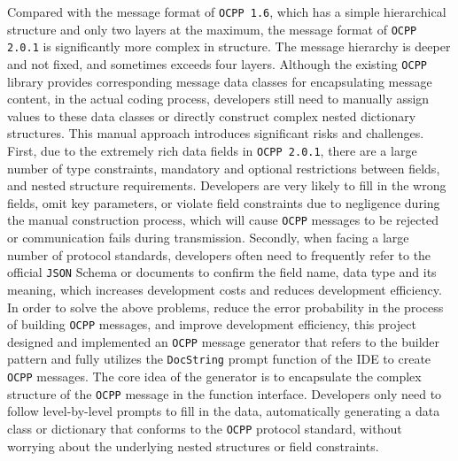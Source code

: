 \documentclass[
english,
ruledheaders=section,%
class=report,%
thesis={type=Report},%
accentcolor=9c,%
custommargins=true,%
marginpar=false,%
parskip=half-,%
fontsize=11pt,%
logofile={img/tuda_logo.pdf}, %
]{tudapub}
\begin{document}
    Compared with the message format of \texttt{OCPP 1.6}, which has a simple hierarchical structure and only two layers at the maximum, the message format of \texttt{OCPP 2.0.1} is significantly more complex in structure. The message hierarchy is deeper and not fixed, and sometimes exceeds four layers. Although the existing \texttt{OCPP} library provides corresponding message data classes for encapsulating message content, in the actual coding process, developers still need to manually assign values to these data classes or directly construct complex nested dictionary structures. This manual approach introduces significant risks and challenges. First, due to the extremely rich data fields in \texttt{OCPP 2.0.1}, there are a large number of type constraints, mandatory and optional restrictions between fields, and nested structure requirements. Developers are very likely to fill in the wrong fields, omit key parameters, or violate field constraints due to negligence during the manual construction process, which will cause \texttt{OCPP} messages to be rejected or communication fails during transmission. Secondly, when facing a large number of protocol standards, developers often need to frequently refer to the official \texttt{JSON} Schema or documents to confirm the field name, data type and its meaning, which increases development costs and reduces development efficiency. In order to solve the above problems, reduce the error probability in the process of building \texttt{OCPP} messages, and improve development efficiency, this project designed and implemented an \texttt{OCPP} message generator that refers to the builder pattern and fully utilizes the \texttt{DocString} prompt function of the IDE to create \texttt{OCPP} messages. The core idea of the generator is to encapsulate the complex structure of the \texttt{OCPP} message in the function interface. Developers only need to follow level-by-level prompts to fill in the data, automatically generating a data class or dictionary that conforms to the \texttt{OCPP} protocol standard, without worrying about the underlying nested structures or field constraints.

\end{document}
